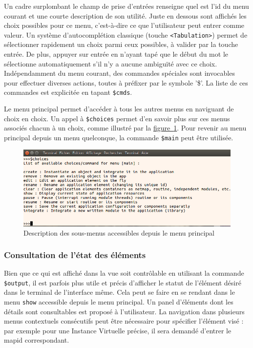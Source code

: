 \documentclass[]{article}
\newcommand{\wordlink}[2]{\hyperref[#1]{#2~\ref{#1}}}
\begin{document}
Un cadre surplombant le champ de prise d'entrées renseigne quel est l'id du menu courant et une courte description de son utilité. Juste en dessous sont affichés les choix possibles pour ce menu, c'est-à-dire ce que l'utilisateur peut entrer comme valeur. Un système d'autocomplétion classique (touche \texttt{<Tabulation>}) permet de sélectionner rapidement un choix parmi ceux possibles, à valider par la touche entrée. De plus, appuyer sur entrée en n'ayant tapé que le début du mot le sélectionne automatiquement s'il n'y a aucune ambiguïté avec ce choix. Indépendamment du menu courant, des commandes spéciales sont invocables pour effectuer diverses actions, toutes à préfixer par le symbole '\$'. La liste de ces commandes est explicitée en tapant \texttt{\$cmds}.\\

\par Le menu principal permet d'accéder à tous les autres menus en naviguant de choix en choix. Un appel à \texttt{\$choices} permet d'en savoir plus sur ces menus associés chacun à un choix, comme illustré par la \wordlink{choicesmain}{figure}. Pour revenir au menu principal depuis un menu quelconque, la commande \texttt{\$main} peut être utilisée.

\begin{figure}[!ht]
\centering
     \includegraphics[width=0.65\linewidth]{choicesmain}
     \caption{Description des sous-menus accessibles depuis le menu principal}
     \label{choicesmain}
\end{figure}

\newpage

\subsubsection{Consultation de l'état des éléments}

Bien que ce qui est affiché dans la vue soit contrôlable en utilisant la commande \texttt{\$output}, il est parfois plus utile et précis d'afficher le statut de l'élément désiré dans le terminal de l'interface même. Cela peut se faire en se rendant dans le menu \texttt{show} accessible depuis le menu principal. Un panel d'éléments dont les détails sont consultables est proposé à l'utilisateur. La navigation dans plusieurs menus contextuels consécutifs peut être nécessaire pour spécifier l'élément visé : par exemple pour une Instance Virtuelle précise, il sera demandé d'entrer le mapid correspondant.\\
\end{document}
